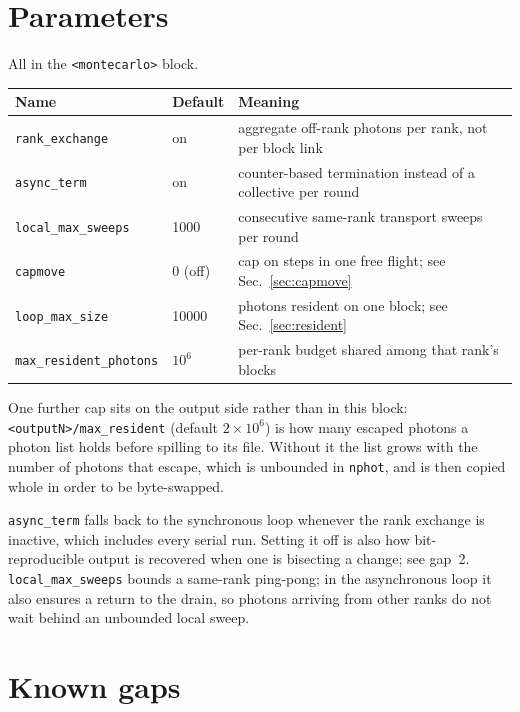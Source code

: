 \documentclass[11pt]{article}
\begin{document}
\section{Parameters}

All in the \texttt{<montecarlo>} block.

\begin{center}
\begin{tabular}{lll}
\toprule
Name & Default & Meaning \\
\midrule
\texttt{rank\_exchange}   & on  & aggregate off-rank photons per rank, not per block link \\
\texttt{async\_term}      & on  & counter-based termination instead of a collective per round \\
\texttt{local\_max\_sweeps} & 1000 & consecutive same-rank transport sweeps per round \\
\texttt{capmove}          & 0 (off) & cap on steps in one free flight; see Sec.~\ref{sec:capmove} \\
\texttt{loop\_max\_size}  & 10000 & photons resident on one block; see Sec.~\ref{sec:resident} \\
\texttt{max\_resident\_photons} & $10^{6}$ & per-rank budget shared among that rank's blocks \\
\bottomrule
\end{tabular}
\end{center}

One further cap sits on the output side rather than in this block:
\texttt{<outputN>/max\_resident} (default $2\times10^{6}$) is how many escaped photons a
photon list holds before spilling to its file. Without it the list grows with the number of
photons that escape, which is unbounded in \texttt{nphot}, and is then copied whole in order
to be byte-swapped.

\texttt{async\_term} falls back to the synchronous loop whenever the rank exchange is
inactive, which includes every serial run. Setting it off is also how bit-reproducible
output is recovered when one is bisecting a change; see gap~2. \texttt{local\_max\_sweeps} bounds a same-rank
ping-pong; in the asynchronous loop it also ensures a return to the drain, so photons
arriving from other ranks do not wait behind an unbounded local sweep.

\section{Known gaps}
\end{document}
